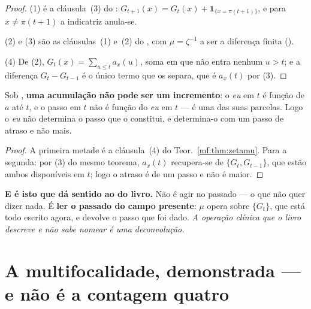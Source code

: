 \documentclass[../livro.tex]{subfiles}
\begin{document}
\begin{proof}
(1) é a cláusula~(3) do :
$G_{t+1}(x)=G_t(x)+\mathbf{1}_{\{x=\pi(t+1)\}}$, e para $x\neq\pi(t+1)$ a
indicatriz anula-se.

(2) e (3) são as cláusulas~(1) e~(2) do
, com
$\mu=\zeta^{-1}$ a ser a diferença finita
().

(4) De (2), $G_t(x)=\sum_{u\le t}a_x(u)$, soma em que não entra nenhum $u>t$; e a
diferença $G_t-G_{t-1}$ é o único termo que os separa, que é $a_x(t)$ por (3).
\end{proof}

\begin{corolario}\label{mf:cor:vitima}
Sob , \textbf{uma acumulação não pode ser um incremento}: o \emph{eu} em
$t$ é função de $a$ até $t$, e o passo em $t$ não é função do \emph{eu} em $t$
--- é uma das suas parcelas. Logo o \emph{eu} não determina o passo que o
constitui, e determina-o com um passo de atraso e não mais.
\end{corolario}

\begin{proof}
A primeira metade é a cláusula~(4) do Teor.~\ref{mf:thm:zetamu}. Para a segunda:
por (3) do mesmo teorema, $a_x(t)$ recupera-se de $\{G_t,G_{t-1}\}$, que estão
ambos disponíveis em $t$; logo o atraso é de um passo e não é maior.
\end{proof}

\medskip\noindent\textbf{E é isto que dá sentido ao  do
livro.} Não é agir no passado --- o que não quer dizer nada. É \textbf{ler o
passado do campo presente}: $\mu$ opera sobre $\{G_t\}$, que está todo escrito
agora, e devolve o passo que foi dado. \emph{A operação clínica que o livro
descreve e não sabe nomear é uma deconvolução.}


\section{A multifocalidade, demonstrada --- e não é a contagem quatro}\label{mf:multi}
\end{document}
